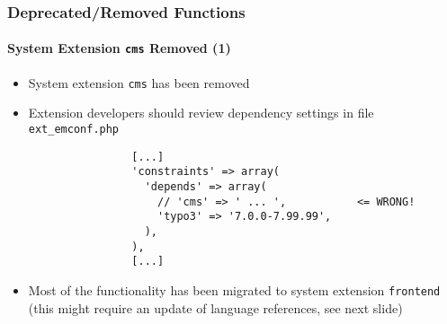 %

\begin{frame}[fragile]
	\frametitle{Deprecated/Removed Functions}
	\framesubtitle{System Extension \texttt{cms} Removed (1)}

	\lstset{basicstyle=\tiny\ttfamily}

	\begin{itemize}

		\item System extension \texttt{cms} has been removed

		\item Extension developers should review dependency settings in file \texttt{ext\_emconf.php}

			\begin{lstlisting}
				[...]
				'constraints' => array(
				  'depends' => array(
				    // 'cms' => ' ... ',           <= WRONG!
				    'typo3' => '7.0.0-7.99.99',
				  ),
				),
				[...]
			\end{lstlisting}

		\item Most of the functionality has been migrated to system extension \texttt{frontend}
			(this might require an update of language references, see next slide)

	\end{itemize}

\end{frame}



